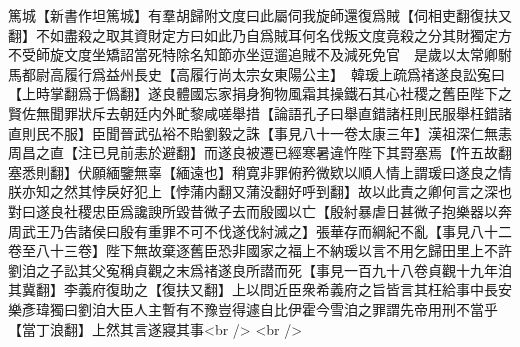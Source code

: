 篤城【新書作坦篤城】有羣胡歸附文度曰此屬伺我旋師還復爲賊【伺相吏翻復扶又翻】不如盡殺之取其資財定方曰如此乃自爲賊耳何名伐叛文度竟殺之分其財獨定方不受師旋文度坐矯詔當死特除名知節亦坐逗遛追賊不及減死免官　是歲以太常卿駙馬都尉高履行爲益州長史【高履行尚太宗女東陽公主】　韓瑗上疏爲禇遂良訟寃曰【上時掌翻爲于僞翻】遂良體國忘家捐身狥物風霜其操鐵石其心社稷之舊臣陛下之賢佐無聞罪狀斥去朝廷内外甿黎咸嗟舉措【論語孔子曰舉直錯諸枉則民服舉枉錯諸直則民不服】臣聞晉武弘裕不貽劉毅之誅【事見八十一卷太康三年】漢祖深仁無恚周昌之直【注已見前恚於避翻】而遂良被遷已經寒暑違忤陛下其罸塞焉【忤五故翻塞悉則翻】伏願緬鑒無辜【緬遠也】稍寛非罪俯矜微欵以順人情上謂瑗曰遂良之情朕亦知之然其悖戾好犯上【悖蒲内翻又蒲没翻好呼到翻】故以此責之卿何言之深也對曰遂良社稷忠臣爲讒諛所毀昔微子去而殷國以亡【殷紂暴虐日甚微子抱樂器以奔周武王乃告諸侯曰殷有重罪不可不伐遂伐紂滅之】張華存而綱紀不亂【事見八十二卷至八十三卷】陛下無故棄逐舊臣恐非國家之福上不納瑗以言不用乞歸田里上不許　劉洎之子訟其父寃稱貞觀之末爲禇遂良所譛而死【事見一百九十八卷貞觀十九年洎其冀翻】李義府復助之【復扶又翻】上以問近臣衆希義府之旨皆言其枉給事中長安樂彥瑋獨曰劉洎大臣人主暫有不豫豈得遽自比伊霍今雪洎之罪謂先帝用刑不當乎【當丁浪翻】上然其言遂寢其事<br />
<br />
